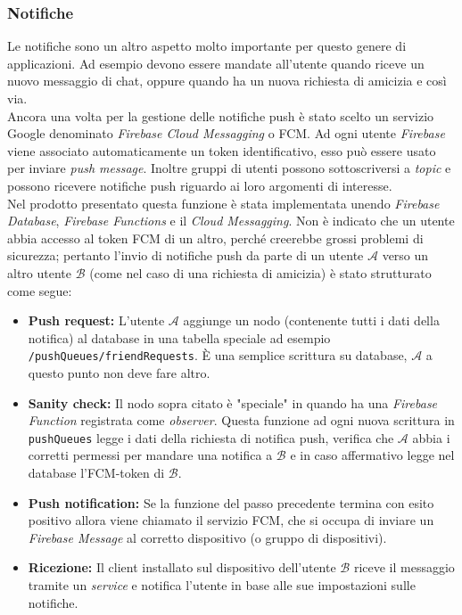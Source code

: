 \documentclass[conference]{IEEEtran}
\begin{document}
		\subsubsection{Notifiche}
			Le notifiche sono un altro aspetto molto importante per questo genere di applicazioni. Ad esempio devono essere mandate
			all'utente quando riceve un nuovo messaggio di chat, oppure quando ha un nuova richiesta di amicizia e così via.\\
			Ancora una volta per la gestione delle notifiche push è stato scelto un servizio Google denominato \textit{Firebase Cloud Messagging} o FCM.
			Ad ogni utente \textit{Firebase} viene associato automaticamente un token identificativo, esso può essere usato per inviare
			\textit{push message}. Inoltre gruppi di utenti possono sottoscriversi a \textit{topic} e possono ricevere notifiche push
			riguardo ai loro argomenti di interesse.\\
			Nel prodotto presentato questa funzione è stata implementata unendo \textit{Firebase Database}, \textit{Firebase Functions} e il \textit{Cloud Messagging}.
			Non è indicato che un utente abbia accesso al token FCM di un altro, perché creerebbe grossi problemi di sicurezza; pertanto
			l'invio di notifiche push da parte di un utente $\mathcal{A}$ verso un altro utente $\mathcal{B}$ (come nel caso di una richiesta di amicizia)
			è stato strutturato come segue:
			\begin{itemize}
				\item \textbf{Push request:} L'utente $\mathcal{A}$ aggiunge un nodo (contenente tutti i dati della notifica) al database in una tabella speciale ad esempio
					\texttt{/pushQueues/friendRequests}. È una semplice scrittura su database, $\mathcal{A}$ a questo punto non deve fare altro.
				\item \textbf{Sanity check:} Il nodo sopra citato è "speciale" in quando ha una \textit{Firebase Function} registrata come \textit{observer}.
					Questa funzione ad ogni nuova scrittura in \texttt{pushQueues} legge i dati della richiesta di notifica push, verifica che $\mathcal{A}$ abbia
					i corretti permessi per mandare una notifica a $\mathcal{B}$ e in caso affermativo legge nel database l'FCM-token di $\mathcal{B}$.
				\item \textbf{Push notification:} Se la funzione del passo precedente termina con esito positivo allora viene chiamato il servizio FCM, che si occupa
					di inviare un \textit{Firebase Message} al corretto dispositivo (o gruppo di dispositivi).
				\item \textbf{Ricezione:} Il client installato sul dispositivo dell'utente $\mathcal{B}$ riceve il messaggio tramite un \textit{service} e notifica
					l'utente in base alle sue impostazioni sulle notifiche.
			\end{itemize}
\end{document}
